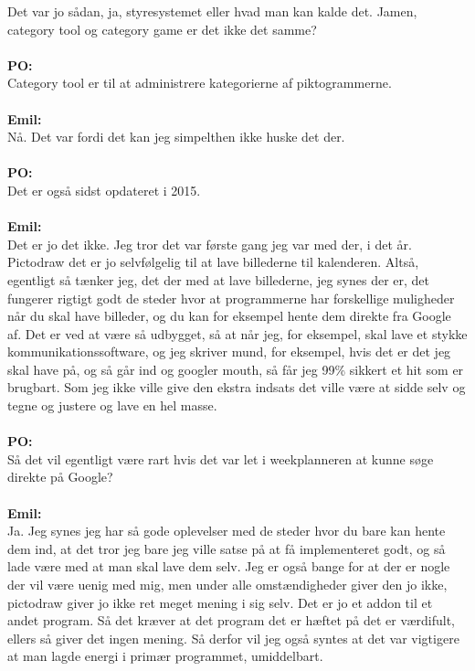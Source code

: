 Det var jo sådan, ja, styresystemet eller hvad man kan kalde det.
Jamen, category tool og category game er det ikke det samme? 
\\\\
\textbf{PO:}\\
Category tool er til at administrere kategorierne af piktogrammerne.
\\\\
\textbf{Emil:}\\
Nå.
Det var fordi det kan jeg simpelthen ikke huske det der.
\\\\
\textbf{PO:}\\
Det er også sidst opdateret i 2015.
\\\\
\textbf{Emil:}\\
Det er jo det ikke.
Jeg tror det var første gang jeg var med der, i det år.
Pictodraw det er jo selvfølgelig til at lave billederne til kalenderen.
Altså, egentligt så tænker jeg, det der med at lave billederne, jeg synes der er, det fungerer rigtigt godt de steder hvor at programmerne har forskellige muligheder når du skal have billeder, og du kan for eksempel hente dem direkte fra Google af.
Det er ved at være så udbygget, så at når jeg, for eksempel, skal lave et stykke kommunikationssoftware, og jeg skriver mund, for eksempel, hvis det er det jeg skal have på, og så går ind og googler mouth, så får jeg 99\% sikkert et hit som er brugbart.
Som jeg ikke ville give den ekstra indsats det ville være at sidde selv og tegne og justere og lave en hel masse.
\\\\
\textbf{PO:}\\
Så det vil egentligt være rart hvis det var let i weekplanneren at kunne søge direkte på Google?
\\\\
\textbf{Emil:}\\
Ja.
Jeg synes jeg har så gode oplevelser med de steder hvor du bare kan hente dem ind, at det tror jeg bare jeg ville satse på at få implementeret godt, og så lade være med at man skal lave dem selv.
Jeg er også bange for at der er nogle der vil være uenig med mig, men under alle omstændigheder giver den jo ikke, pictodraw giver jo ikke ret meget mening i sig selv.
Det er jo et addon til et andet program.
Så det kræver at det program det er hæftet på det er værdifult, ellers så giver det ingen mening.
Så derfor vil jeg også syntes at det var vigtigere at man lagde energi i primær programmet, umiddelbart.
